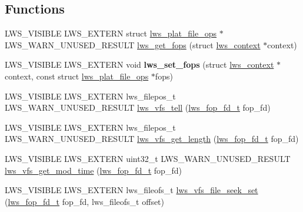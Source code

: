 \subsection*{Functions}
\begin{DoxyCompactItemize}
\item 
L\+W\+S\+\_\+\+V\+I\+S\+I\+B\+LE L\+W\+S\+\_\+\+E\+X\+T\+E\+RN struct \hyperlink{structlws__plat__file__ops}{lws\+\_\+plat\+\_\+file\+\_\+ops} $\ast$L\+W\+S\+\_\+\+W\+A\+R\+N\+\_\+\+U\+N\+U\+S\+E\+D\+\_\+\+R\+E\+S\+U\+LT \hyperlink{group__fops_gac08aef64c4c34647ed699b24759b6b0e}{lws\+\_\+get\+\_\+fops} (struct \hyperlink{structlws__context}{lws\+\_\+context} $\ast$context)
\item 
\mbox{\label{group__fops_gaac73ba2b3ddcd3f97f6ec23ff5407c5f}} 
L\+W\+S\+\_\+\+V\+I\+S\+I\+B\+LE L\+W\+S\+\_\+\+E\+X\+T\+E\+RN void {\bfseries lws\+\_\+set\+\_\+fops} (struct \hyperlink{structlws__context}{lws\+\_\+context} $\ast$context, const struct \hyperlink{structlws__plat__file__ops}{lws\+\_\+plat\+\_\+file\+\_\+ops} $\ast$fops)
\item 
L\+W\+S\+\_\+\+V\+I\+S\+I\+B\+LE L\+W\+S\+\_\+\+E\+X\+T\+E\+RN lws\+\_\+filepos\+\_\+t L\+W\+S\+\_\+\+W\+A\+R\+N\+\_\+\+U\+N\+U\+S\+E\+D\+\_\+\+R\+E\+S\+U\+LT \hyperlink{group__fops_ga3e71b9e0f12cfe134ab1c9689ff5463b}{lws\+\_\+vfs\+\_\+tell} (\hyperlink{structlws__fop__fd}{lws\+\_\+fop\+\_\+fd\+\_\+t} fop\+\_\+fd)
\item 
L\+W\+S\+\_\+\+V\+I\+S\+I\+B\+LE L\+W\+S\+\_\+\+E\+X\+T\+E\+RN lws\+\_\+filepos\+\_\+t L\+W\+S\+\_\+\+W\+A\+R\+N\+\_\+\+U\+N\+U\+S\+E\+D\+\_\+\+R\+E\+S\+U\+LT \hyperlink{group__fops_gac858c510999bf0779d10668d2617a445}{lws\+\_\+vfs\+\_\+get\+\_\+length} (\hyperlink{structlws__fop__fd}{lws\+\_\+fop\+\_\+fd\+\_\+t} fop\+\_\+fd)
\item 
L\+W\+S\+\_\+\+V\+I\+S\+I\+B\+LE L\+W\+S\+\_\+\+E\+X\+T\+E\+RN uint32\+\_\+t L\+W\+S\+\_\+\+W\+A\+R\+N\+\_\+\+U\+N\+U\+S\+E\+D\+\_\+\+R\+E\+S\+U\+LT \hyperlink{group__fops_ga1d1e9a470d48eeff0f18934c9338c5ed}{lws\+\_\+vfs\+\_\+get\+\_\+mod\+\_\+time} (\hyperlink{structlws__fop__fd}{lws\+\_\+fop\+\_\+fd\+\_\+t} fop\+\_\+fd)
\item 
L\+W\+S\+\_\+\+V\+I\+S\+I\+B\+LE L\+W\+S\+\_\+\+E\+X\+T\+E\+RN lws\+\_\+fileofs\+\_\+t \hyperlink{group__fops_ga23eb98c37dd3df5c97115ea469c6a89b}{lws\+\_\+vfs\+\_\+file\+\_\+seek\+\_\+set} (\hyperlink{structlws__fop__fd}{lws\+\_\+fop\+\_\+fd\+\_\+t} fop\+\_\+fd, lws\+\_\+fileofs\+\_\+t offset)
\item 

\end{DoxyCompactItemize}
